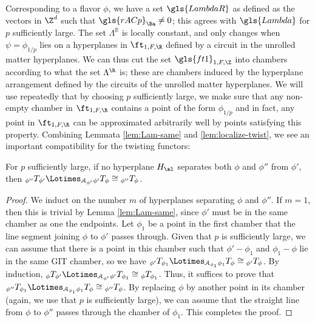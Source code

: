 Corresponding to a flavor $\phi$, we have a set $\gls{LambdaR}$ as defined as the vectors in $\Z^d$ such that $\gls{rACp}_{\Ba}\neq 0$; this agrees with $\gls{Lambda}$ for $p$ sufficiently large.  The set $\Lambda^{\mathbb{R}}$ is locally constant, and only changes when $\psi=\phi_{1/p}$ lies on a hyperplanes in $\ft_{1,F,\R}$ defined by a circuit in the unrolled matter hyperplanes.  We can thus cut the set $\gls{ft1}_{1,F,\Z}$ into chambers according to what the set $\Lambda^\R$ is; these are chambers induced by the hyperplane arrangement defined by the circuits of the unrolled matter hyperplanes.  We will use repeatedly that by choosing $p$ sufficiently large, we make sure that any non-empty chamber in $\ft_{1,F,\R}$ contains a point of the form $\phi_{1/p}$ and in fact, any point in $\ft_{1,F,\R}$ can be approximated arbitrarily well by points satisfying this property.  
Combining Lemmata \ref{lem:Lam-same} and \ref{lem:localize-twist}, we see an important compatibility for the twisting functors:
\begin{lemma}\label{lem:just-hyperplanes}
  For $p$ sufficiently large, if no hyperplane $H_\al$ separates both $\phi$ and $\phi''$ from $\phi'$, then ${}_{\phi''}T_{\phi'}\Lotimes_{\EuScript{A}_{\phi'}} {}_{\phi'}T_{\phi}\cong {}_{\phi''}T_{\phi}$.
\end{lemma}
\begin{proof}
We induct on the number $m$ of hyperplanes separating $\phi$ and $\phi''$.  If $m=1$, then this is trivial by Lemma  \ref{lem:Lam-same}, since $\phi'$ must be in the same chamber as one the endpoints.  Let $\phi_1$ be a point in the first chamber that the line segment joining $\phi $ to $\phi'$ passes through.  Given that $p$ is sufficiently large, we can assume that there is a point in this chamber such that $\phi'-\phi_1$ and $\phi_1-\phi$ lie in the same GIT chamber, so we have ${}_{\phi'}T_{\phi_1}\Lotimes_{\EuScript{A}_{\phi_1}} {}_{\phi_1}T_{\phi}\cong {}_{\phi'}T_{\phi}$.  By induction, ${}_{\phi}T_{\phi'}\Lotimes_{\EuScript{A}_{\phi'}} {}_{\phi'}T_{\phi_1}\cong {}_{\phi}T_{\phi_1}$.  Thus, it suffices to prove that ${}_{\phi''}T_{\phi_1}\Lotimes_{\EuScript{A}_{\phi_1}} {}_{\phi_1}T_{\phi}\cong {}_{\phi''}T_{\phi}$.  By replacing $\phi$ by another point in its chamber (again, we use that $p$ is sufficiently large), we can assume that the straight line from $\phi$ to $\phi''$ passes through the chamber of $\phi_{1}$. This completes the proof.
\end{proof}



